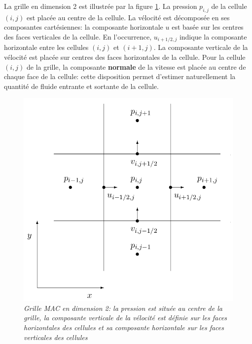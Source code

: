 \documentclass[11pt]{article}
\begin{document}
La grille en dimension 2 est illustrée par la figure \ref{figure/2d-mac-grid}. La pression $p_{i,j}$ de la cellule $(i, j)$ est placée au centre de la cellule. La vélocité est décomposée en ses composantes cartésiennes: la composante horizontale $ u $ est basée sur les centres des faces verticales de la cellule. En l’occurrence, $ u_{i+1/2, j} $ indique la composante horizontale entre les cellules $(i, j)$ et $(i+1, j)$. La composante verticale de la vélocité est placée sur centres des faces horizontales de la cellule. Pour la cellule $(i, j)$ de la grille, la composante \textbf{normale} de la vitesse est placée au centre de chaque face de la cellule: cette disposition permet d'estimer naturellement la quantité de fluide entrante et sortante de la cellule. \newline

\begin{figure}[!htbp]
\centering
\includegraphics[scale=0.5]{2d-mac-grid.png}
\caption{\textit{Grille MAC en dimension 2: la pression est située au centre de la grille, la composante verticale de la vélocité est définie sur les faces horizontales des cellules et sa composante horizontale sur les faces verticales des cellules}}
\label{figure/2d-mac-grid}
\end{figure}
\end{document}
